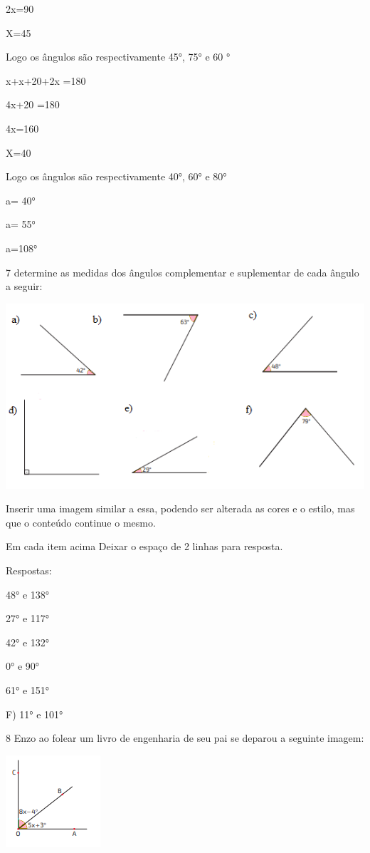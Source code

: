 2x=90

X=45

Logo os ângulos são respectivamente 45°, 75° e 60 °

\item 

x+x+20+2x =180

4x+20 =180

4x=160

X=40

Logo os ângulos são respectivamente 40°, 60° e 80°

\item a= 40°
\item a= 55°
\item a=108°

\num{7} determine as medidas dos ângulos complementar e suplementar de cada
ângulo a seguir:

\includegraphics[width=4\times 81667in,height=2\times 48373in]{./imgSAEB_8_MAT/media/image30.png}

Inserir uma imagem similar a essa, podendo ser alterada as cores e o
estilo, mas que o conteúdo continue o mesmo.

Em cada item acima Deixar o espaço de 2 linhas para resposta.

Respostas:

\item 48° e 138°
\item 27° e 117°
\item 42° e 132°
\item 0° e 90°
\item 61° e 151°

F) 11° e 101°

\num{8} Enzo ao folear um livro de engenharia de seu pai se deparou a
seguinte imagem:

\includegraphics[width=1\times 47134in,height=1\times 42708in]{./imgSAEB_8_MAT/media/image31.png}

